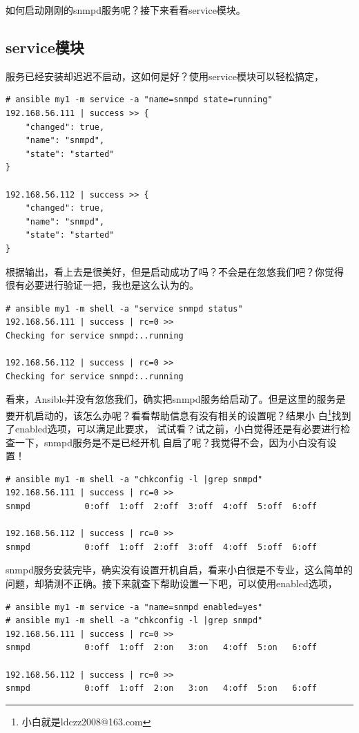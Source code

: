 如何启动刚刚的snmpd服务呢？接下来看看service模块。

\subsection{service模块}
\label{sec:AnsibleServiceMod}

服务已经安装却迟迟不启动，这如何是好？使用service模块可以轻松搞定，
\begin{verbatim}
# ansible my1 -m service -a "name=snmpd state=running"
192.168.56.111 | success >> {
    "changed": true, 
    "name": "snmpd", 
    "state": "started"
}

192.168.56.112 | success >> {
    "changed": true, 
    "name": "snmpd", 
    "state": "started"
}
\end{verbatim}
根据输出，看上去是很美好，但是启动成功了吗？不会是在忽悠我们吧？你觉得
很有必要进行验证一把，我也是这么认为的。
\begin{verbatim}
# ansible my1 -m shell -a "service snmpd status"
192.168.56.111 | success | rc=0 >>
Checking for service snmpd:..running

192.168.56.112 | success | rc=0 >>
Checking for service snmpd:..running
\end{verbatim}
看来，Ansible并没有忽悠我们，确实把snmpd服务给启动了。但是这里的服务是
要开机启动的，该怎么办呢？看看帮助信息有没有相关的设置呢？结果小
白\footnote{小白就是ldczz2008@163.com}找到了enabled选项，可以满足此要求，
试试看？试之前，小白觉得还是有必要进行检查一下，snmpd服务是不是已经开机
自启了呢？我觉得不会，因为小白没有设置！
\begin{verbatim}
# ansible my1 -m shell -a "chkconfig -l |grep snmpd"
192.168.56.111 | success | rc=0 >>
snmpd           0:off  1:off  2:off  3:off  4:off  5:off  6:off

192.168.56.112 | success | rc=0 >>
snmpd           0:off  1:off  2:off  3:off  4:off  5:off  6:off
\end{verbatim}
snmpd服务安装完毕，确实没有设置开机自启，看来小白很是不专业，这么简单的
问题，却猜测不正确。接下来就查下帮助设置一下吧，可以使用enabled选项，
\begin{verbatim}
# ansible my1 -m service -a "name=snmpd enabled=yes"
# ansible my1 -m shell -a "chkconfig -l |grep snmpd"
192.168.56.111 | success | rc=0 >>
snmpd           0:off  1:off  2:on   3:on   4:off  5:on   6:off

192.168.56.112 | success | rc=0 >>
snmpd           0:off  1:off  2:on   3:on   4:off  5:on   6:off
\end{verbatim}
